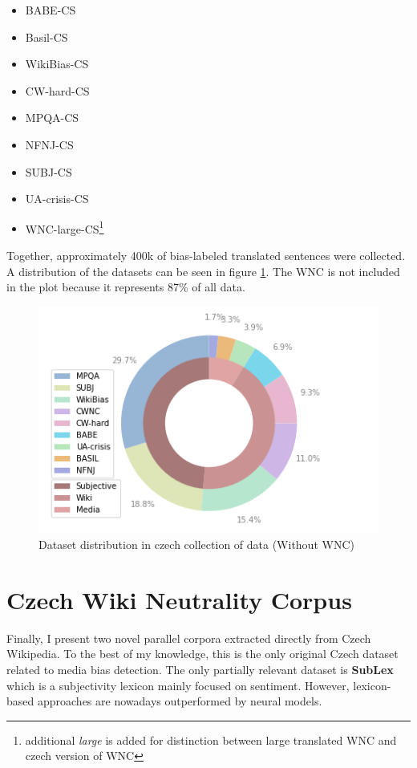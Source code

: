 \begin{itemize}
    \item BABE-CS
    \item Basil-CS
    \item WikiBias-CS
    \item CW-hard-CS
    \item MPQA-CS
    \item NFNJ-CS
    \item SUBJ-CS
    \item UA-crisis-CS
    \item WNC-large-CS\footnote{additional \textit{large} is added for distinction between large translated WNC and czech version of WNC}
\end{itemize}

Together, approximately 400k of bias-labeled translated sentences were collected. A distribution of the datasets can be seen in figure \ref{fig:cz_data}. The WNC is not included in the plot because it represents 87\% of all data. 


\begin{figure}
  \includegraphics[scale=0.5]{my_modules/multimedia/withoutWNC.png}
  \caption{Dataset distribution in czech collection of data (Without WNC)}
  \label{fig:cz_data}
\end{figure}




\section{Czech Wiki Neutrality Corpus}
Finally, I present two novel parallel corpora extracted directly from Czech Wikipedia. To the best of my knowledge, this is the only original Czech dataset related to media bias detection. The only partially relevant dataset is \textbf{SubLex}\cite{11858/00-097C-0000-0022-FF60-B} which is a subjectivity lexicon mainly focused on sentiment. However, lexicon-based approaches are nowadays outperformed by neural models.

